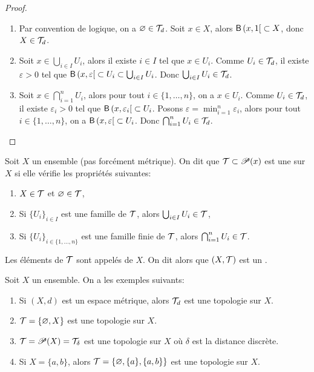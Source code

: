 \begin{proof}\,
    \begin{enumerate}[label=(\roman*)] %
        \item Par convention de logique, on a \(\varnothing\in \mathcal{T}_d\).
        Soit \(x \in X\), alors \(\mathsf{B}\left({x, 1}\mathopen{}\right[\mathclose{} \subset X\), donc \(X \in \mathcal{T}_d\).

        \item Soit \(x \in \bigcup_{i \in I} U_i\), alors il existe \(i \in I\) tel que \(x \in U_i\).
        Comme \(U_i \in \mathcal{T}_d\), il existe \(\varepsilon > 0\) tel que \(\mathsf{B}\left({x, \varepsilon}\mathopen{}\right[\mathclose{} \subset U_i \subset \bigcup_{i \in I} U_i\).
        Donc \(\bigcup_{i \in I} U_i \in \mathcal{T}_d\).

        \item Soit \(x \in \bigcap_{i = 1}^n U_i\), alors pour tout \(i \in \{1, \ldots, n\}\), on a \(x \in U_i\).
        Comme \(U_i \in \mathcal{T}_d\), il existe \(\varepsilon_i > 0\) tel que \(\mathsf{B}\left({x, \varepsilon_i}\mathopen{}\right[\mathclose{} \subset U_i\).
        Posons \(\varepsilon = \min_{i = 1}^n \varepsilon_i\), alors pour tout \(i \in \{1, \ldots, n\}\), on a \(\mathsf{B}\left({x, \varepsilon}\mathopen{}\right[\mathclose{} \subset U_i\).
        Donc \(\bigcap_{i = 1}^n U_i \in \mathcal{T}_d\).
    \end{enumerate}
\end{proof}

\begin{definition}
    Soit \(X\) un ensemble (pas forcément métrique). On dit que
    \(\mathcal{T} \subset\mathscr{P}(x)\) est une  sur \(X\) si
    elle vérifie les propriétés suivantes:
    \begin{enumerate}[label=(\roman*)] %
        \item \(X \in \mathcal{T}\) et \(\varnothing \in \mathcal{T}\),
        \item Si \({\{U_i\}}_{i \in I}\) est une famille de \(\mathcal{T}\), alors \(\bigcup_{i \in I} U_i \in \mathcal{T}\),
        \item Si  \({\{U_i\}}_{i \in \{1, \ldots, n\}}\) est une famille finie de \(\mathcal{T}\), alors \(\bigcap_{i = 1}^n U_i \in \mathcal{T}\).
    \end{enumerate}

    Les éléments de \(\mathcal{T}\) sont appelés  de \(X\).
    On dit alors que \((X, \mathcal{T})\) est un .
\end{definition}

\begin{example}
    Soit \(X\) un ensemble. On a les exemples suivants:
    \begin{enumerate}[label=(\alph*)] %
        \item Si \((X, d)\) est un espace métrique, alors \(\mathcal{T}_d\) est une topologie sur \(X\).
        \item \(\mathcal{T} = \{\varnothing, X\}\) est une topologie sur \(X\).
        \item \(\mathcal{T} = \mathscr{P}(X) = \mathcal{T}_\delta\) est une topologie sur \(X\) où \(\delta\) est la distance discrète.
        \item Si \(X = \{a, b\}\), alors \(\mathcal{T} = \{\varnothing, \{a\}, \{a, b\}\}\) est une topologie sur \(X\).
    \end{enumerate}
\end{example}


